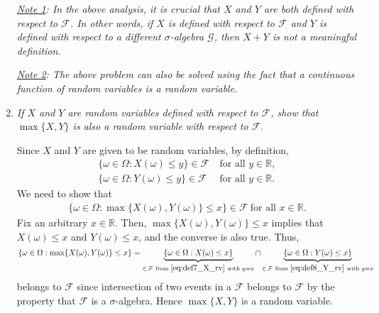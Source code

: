 \documentclass[11pt]{article}
\begin{document}
\begin{enumerate}
\par \emph{\underline{Note 1}: In the above analysis, it is crucial that $X$ and $Y$ are both defined with respect to $\mathcal{F}$. In other words, if $X$ is defined with respect to $\mathcal{F}$ and $Y$ is defined with respect to a different $\sigma$-algebra $\mathcal{G}$, then $X+Y$ is not a meaningful definition.}\\

\par \emph{\underline{Note 2}: The above problem can also be solved using the fact that a continuous function of random variables is a random variable.}\\
\vspace{0.2cm}

\item \emph{If $X$ and $Y$ are random variables defined with respect to $\mathcal{F}$, show that $\max\{X,Y\}$ is also a random variable with respect to $\mathcal{F}$}.

\par Since $X$ and $Y$ are given to be random variables, by definition,
\begin{align}
\{\omega\in \Omega:X(\omega)\leq y\}\in \mathcal{F}~&\text{for all }y\in \mathbb{R},\label{eq:def7_X_rv}\\
\{\omega\in \Omega:Y(\omega)\leq y\}\in \mathcal{F}~&\text{for all }y\in \mathbb{R}.\label{eq:def8_Y_rv}
\end{align}
We need to show that
\begin{eqnarray}
\{\omega\in \Omega:\max\{X(\omega),Y(\omega)\}\leq x\}\in \mathcal{F}~\text{for all }x\in \mathbb{R}.\label{eq:def_max_XY_rv}
\end{eqnarray}
Fix an arbitrary $x\in \mathbb{R}$. Then, $\max\{X(\omega),Y(\omega)\}\leq x$ implies that $X(\omega)\leq x$ and $Y(\omega)\leq x$, and the converse is also true. Thus,
\begin{equation}
\{\omega\in \Omega:\max\{X(\omega),Y(\omega)\}\leq x\}=\underbrace{\{\omega\in \Omega:X(\omega)\leq x\}}_{\in\, \mathcal{F}~\text{from }\eqref{eq:def7_X_rv}~\text{with } y=x} \cap \underbrace{\{\omega\in \Omega:Y(\omega)\leq x\}}_{\in\, \mathcal{F}~\text{from }\eqref{eq:def8_Y_rv}~\text{with } y=x}
\end{equation}
belongs to $\mathcal{F}$ since intersection of two events in a $\mathcal{F}$ belongs to $\mathcal{F}$ by the property that $\mathcal{F}$ is a $\sigma$-algebra. Hence $\max\{X,Y\}$ is a random variable.
\vspace{0.2cm}\\


\end{enumerate}
\end{document}
